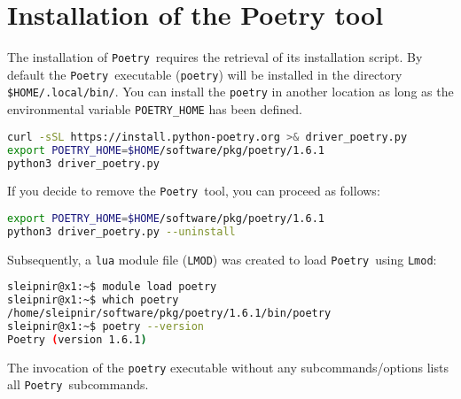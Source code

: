 \documentclass[10pt]{article}
\newcommand{\POETRY}{\texttt{Poetry}}
\begin{document}
\section{Installation of the Poetry tool}
The installation of \POETRY\ requires the retrieval of its installation script. By default the \POETRY\ executable 
(\texttt{poetry}) will be installed in the directory \texttt{\$HOME/.local/bin/}. 
You can install the \texttt{poetry} in another location 
as long as the environmental variable \texttt{POETRY\_HOME} has been defined.
\begin{lstlisting}[language=bash]
curl -sSL https://install.python-poetry.org >& driver_poetry.py
export POETRY_HOME=$HOME/software/pkg/poetry/1.6.1
python3 driver_poetry.py
\end{lstlisting}
If you decide to remove the \POETRY\ tool, you can proceed as follows:
\begin{lstlisting}[language=bash]
export POETRY_HOME=$HOME/software/pkg/poetry/1.6.1
python3 driver_poetry.py --uninstall
\end{lstlisting}
Subsequently, a \texttt{lua} module file (\texttt{LMOD}) was created to load \POETRY\ using \texttt{Lmod}:
\begin{lstlisting}[language=bash]
sleipnir@x1:~$ module load poetry
sleipnir@x1:~$ which poetry
/home/sleipnir/software/pkg/poetry/1.6.1/bin/poetry
sleipnir@x1:~$ poetry --version
Poetry (version 1.6.1)
\end{lstlisting}
The invocation of the \texttt{poetry} executable without any subcommands/options lists all \POETRY\ subcommands.
\end{document}
